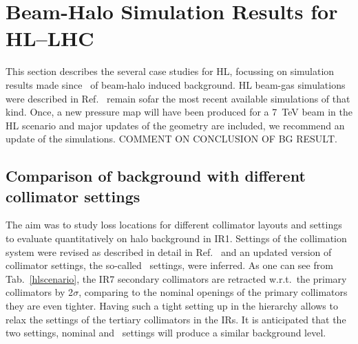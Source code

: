 \section{Beam-Halo Simulation Results for HL--LHC\label{hllhcResults}}


This section describes the several case studies for HL, focussing on simulation results made since~\cite{ipac2014_rkh} of beam-halo induced background. HL beam-gas simulations were described in Ref.~\cite{ipac2014_rkh} remain sofar the most recent available simulations of that kind. Once, a new pressure map will have been produced for a 7~TeV beam in the HL scenario and major updates of the geometry are included, we recommend an update of the simulations. COMMENT ON CONCLUSION OF BG RESULT.

\subsection{Comparison of background with different collimator settings}

The aim was to study loss locations for different collimator layouts and settings to evaluate quantitatively on halo background in IR1. Settings of the collimation system were revised as described in detail in Ref.~\cite{collSettRef} and an updated version of collimator settings, the so-called \twosigmaret~settings, were inferred. As one can see from Tab.~\ref{hlscenario}, the IR7 secondary collimators are retracted w.r.t.~the primary collimators by 2$\sigma$, comparing to the nominal openings of the primary collimators they are even tighter. Having such a tight setting up in the hierarchy allows to relax the settings of the tertiary collimators in the IRs. It is anticipated that the two settings, nominal and \twosigmaret~settings will produce a similar background level.  %


